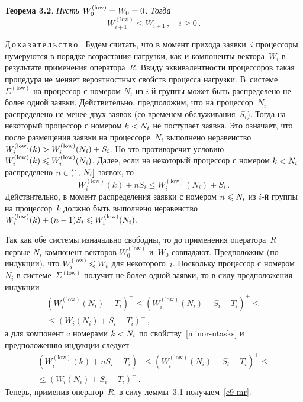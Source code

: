 \begin{multicols}{2}
\medskip

\noindent
\textbf{Теорема 3.2}. 
\textit{Пусть $W_0^{(\mathrm{low})}\hm=W_0\hm=0$. Тогда}
\begin{equation}
W_{i+1}^{(\mathrm{low})}\leqslant W_{i+1}\,,\quad i\ge 0\,.\label{e9-mr}
\end{equation}

\medskip

\noindent
Д\,о\,к\,а\,з\,а\,т\,е\,л\,ь\,с\,т\,в\,о\,.\
Будем считать, что в момент прихода  заявки~$i$ процессоры
нумеруются в порядке возрастания нагрузки,  как и компоненты вектора~$W_i$ 
в результате применения оператора~$R$. Ввиду эквивалентности
процессоров такая процедура не меняет вероятностных свойств процесса
нагрузки. В~сис\-те\-ме  $\Sigma^{(\mathrm{low})}$ на процессор с номером $N_{i}$
из  $i$-й группы  может быть распределено не более одной заявки.
Действительно, предположим, что на процессор~$N_{i}$ распределено не
менее двух заявок (со временем обслуживания~$S_{i}$). Тогда на
некоторый процессор с номером $k\hm<N_{i}$ не поступает  заявка. Это
означает, что после  размещения заявки на процессоре~$N_{i}$ 
выполнено неравенство
$W_{i}^{(\mathrm{low})}(k)\hm>W_{i}^{(\mathrm{low})}(N_{i})\hm+S_{i}$. Но это противоречит
условию $W_{i}^{(\mathrm{low})}(k)\hm\leqslant W_{i}^{(\mathrm{low})}(N_{i})$. Далее,
если на некоторый процессор с номером $k\hm<N_{i}$ распределено $n\hm\in
(1,\, N_{i}]$ заявок, то
    \begin{equation}
    \label{minor-ntasks}
        W_{i}^{(\mathrm{low})}(k)+nS_{i}\leqslant W_{i}^{(\mathrm{low})}(N_{i})+S_{i}\,.
    \end{equation}
Действительно, в момент распределения заявки с номером $n\hm\leqslant
N_{i}$ из $i$-й группы на процессор~$k$ должно быть выполнено
неравенство $W_{i}^{(\mathrm{low})}(k)\hm+(n-1)S_{i}\hm\leqslant
W_{i}^{(\mathrm{low})}(N_{i})$.

Так как  обе системы изначально свободны, то
до применения оператора~$R$ первые $N_{i}$ компонент векторов
$W_{0}^{(\mathrm{low})}$ и~$W_{0}$ совпадают. Предположим (по индукции), что
$W_{i}^{(\mathrm{low})}\hm\leqslant W_{i}$ для некоторого~$i$.
  Поскольку процессор с номером~$N_{i}$ в
  сис\-те\-ме~$\Sigma^{(\mathrm{low})}$ получит не более одной заявки, то в силу
предположения индукции
\begin{multline*}
(W_{i}^{(\mathrm{low})}(N_{i})-T_{i})^{+}\leqslant
(W_{i}^{(\mathrm{low})}(N_{i})+S_{i}-T_{i})^{+} \leqslant{}\\
{}\leqslant
(W_{i}(N_{i})+S_{i}-T_{i})^{+}\,,
\end{multline*}
а для   компонент c номерами  $k\hm<N_i$ по
свойству~\eqref{minor-ntasks} и предположению индукции следует
\begin{multline*}
(W_{i}^{(\mathrm{low})}(k)+nS_{i}-T_{i})^{+} \leqslant
(W_{i}^{(\mathrm{low})}(N_{i})+S_{i}-T_{i})^{+}\leqslant{}\\
{}\leqslant
(W_{i}(N_{i})+S_{i}-T_{i})^{+}\,.
\end{multline*}
Теперь,  применив оператор~$R$,  в силу леммы~3.1
получаем~\eqref{e9-mr}.



\end{multicols}
